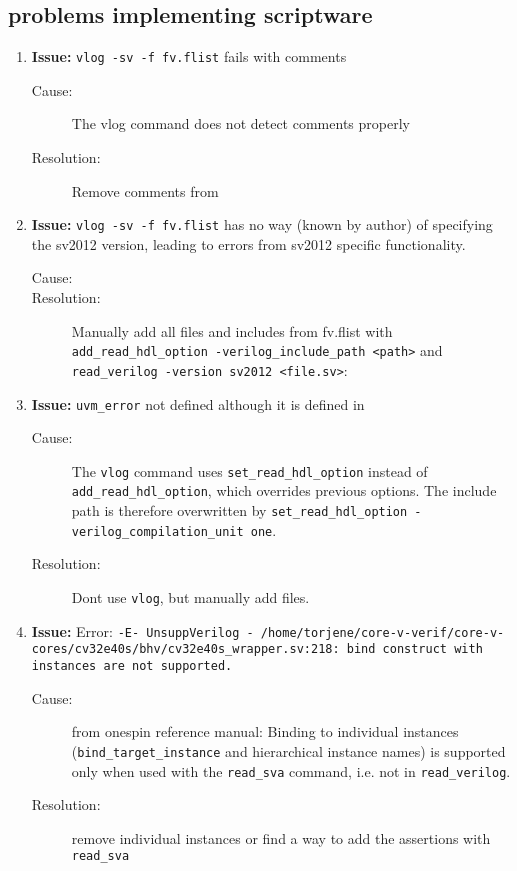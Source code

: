 \subsection{problems implementing scriptware}

\begin{enumerate}


\item \textbf{Issue:} \lstinline{vlog -sv -f fv.flist} fails with comments
  \begin{description}
    \item[Cause:] The vlog command does not detect comments properly
    \item[Resolution:] Remove comments from 
  \end{description}

\item \textbf{Issue:} \lstinline{vlog -sv -f fv.flist} has no way (known by author) of specifying the sv2012 version, leading to errors from sv2012 specific functionality.
  \begin{description}
    \item[Cause:] 
    \item[Resolution:] Manually add all files and includes from fv.flist with \lstinline{add_read_hdl_option -verilog_include_path <path>} and \lstinline{read_verilog -version sv2012 <file.sv>}:
  \end{description}

\item \textbf{Issue:}  \lstinline{uvm_error} not defined although it is defined in 
  \begin{description}
    \item[Cause:] The \lstinline{vlog} command uses \lstinline{set_read_hdl_option} instead of  \lstinline{add_read_hdl_option}, which overrides previous options. The include path is therefore overwritten by \lstinline{set_read_hdl_option -verilog_compilation_unit one}.
    \item[Resolution:] Dont use \lstinline{vlog}, but manually add files.
  \end{description}
  
 \item \textbf{Issue:} Error: \lstinline{-E- UnsuppVerilog - /home/torjene/core-v-verif/core-v-cores/cv32e40s/bhv/cv32e40s_wrapper.sv:218: bind construct with instances are not supported.}
  \begin{description}
    \item[Cause:] from onespin reference manual: Binding to individual instances (\lstinline{bind_target_instance} and hierarchical instance names) is supported only when used with the \lstinline{read_sva} command, i.e. not in \lstinline{read_verilog}.
    \item[Resolution:] remove individual instances or find a way to add the assertions with \lstinline{read_sva}
  \end{description}
  

\end{enumerate}
